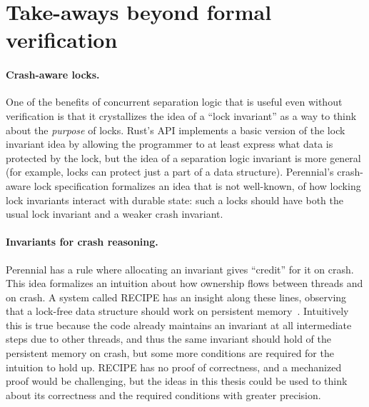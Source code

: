 \section{Take-aways beyond formal verification}

\paragraph{Crash-aware locks.} One of the benefits of concurrent separation
logic that is useful even without verification is that it crystallizes the idea
of a ``lock invariant'' as a way to think about the \emph{purpose} of locks.
Rust's  API implements a basic version of the lock invariant
idea by allowing the programmer to at least express what data is protected by
the lock, but the idea of a separation logic invariant is more general (for
example, locks can protect just a part of a data structure). Perennial's
crash-aware lock specification formalizes an idea that is not well-known, of how
locking lock invariants interact with durable state: such a locks should have
both the usual lock invariant and a weaker crash invariant.

\paragraph{Invariants for crash reasoning.} Perennial has a rule where
allocating an invariant gives ``credit'' for it on crash. This idea formalizes
an intuition about how ownership flows between threads and on crash. A system
called RECIPE has an insight along these lines, observing that a lock-free data
structure should work on persistent memory~\cite{lee:recipe}. Intuitively this
is true because the code already maintains an invariant at all intermediate
steps due to other threads, and thus the same invariant should hold of the
persistent memory on crash, but some more conditions are required for the
intuition to hold up. RECIPE has no proof of correctness, and a mechanized proof
would be challenging, but the ideas in this thesis could be used to think about
its correctness and the required conditions with greater precision.
